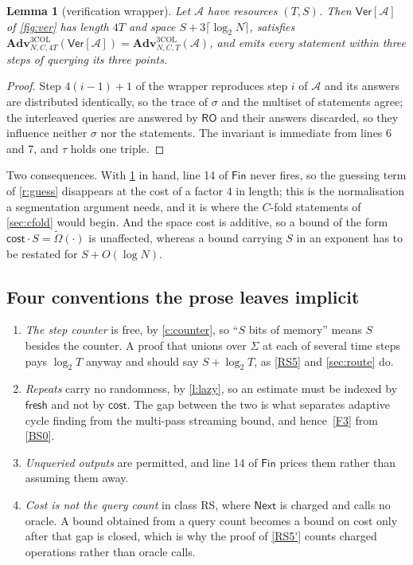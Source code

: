 \documentclass[11pt]{article}
\theoremstyle{plain}
\newtheorem{lemma}{Lemma}
\theoremstyle{definition}
\newcommand{\advers}{\mathcal{A}}
\newcommand{\Next}{\mathsf{Next}}
\newcommand{\cls}[1]{\textsf{#1}}   %
\newcommand{\Col}{\mathrm{3COL}}
\newcommand{\RO}{\mathsf{RO}}
\newcommand{\Fin}{\mathsf{Fin}}
\newcommand{\Ver}{\mathsf{Ver}}
\newcommand{\Adv}{\mathbf{Adv}}
\begin{document}
\begin{lemma}[verification wrapper]\label{l:ver}
Let $\advers$ have resources $(T,S)$.  Then $\Ver[\advers]$ of
\cref{fig:ver} has length $4T$ and space $S + 3\lceil\log_{2}N\rceil$,
satisfies $\Adv^{\Col}_{N,C,4T}(\Ver[\advers]) =
\Adv^{\Col}_{N,C,T}(\advers)$, and emits every statement within three steps
of querying its three points.
\end{lemma}

\begin{proof}
Step $4(i-1)+1$ of the wrapper reproduces step $i$ of $\advers$ and its
answers are distributed identically, so the trace of $\sigma$ and the
multiset of statements agree; the interleaved queries are answered by $\RO$
and their answers discarded, so they influence neither $\sigma$ nor the
statements.  The invariant is immediate from lines 6 and 7, and $\tau$ holds
one triple.
\end{proof}

Two consequences.  With \cref{l:ver} in hand, line 14 of $\Fin$ never fires,
so the guessing term of \cref{r:guess} disappears at the cost of a factor
$4$ in length; this is the normalisation a segmentation argument needs, and
it is where the $C$-fold statements of \cref{sec:cfold} would begin.  And
the space cost is additive, so a bound of the form
$\mathsf{cost} \cdot S = \tilde\Omega(\cdot)$ is unaffected, whereas a bound
carrying $S$ in an exponent has to be restated for $S + O(\log N)$.

\subsection{Four conventions the prose leaves implicit}\label{app:pitfalls}

\begin{enumerate}[leftmargin=*,label=(\roman*)]\itemsep3pt
\item \emph{The step counter} is free, by \cref{c:counter}, so ``$S$ bits of
  memory'' means $S$ besides the counter.  A proof that unions over
  $\Sigma$ at each of several time steps pays $\log_{2}T$ anyway and should
  say $S + \log_{2}T$, as \cref{RS5} and \cref{sec:route} do.
\item \emph{Repeats} carry no randomness, by \cref{l:lazy}, so an estimate
  must be indexed by $\mathsf{fresh}$ and not by $\mathsf{cost}$.  The gap
  between the two is what separates adaptive cycle finding from the
  multi-pass streaming bound, and hence~\ref{F3} from \cref{BS0}.
\item \emph{Unqueried outputs} are permitted, and line 14 of $\Fin$ prices
  them rather than assuming them away.
\item \emph{Cost is not the query count} in class \cls{RS}, where $\Next$ is
  charged and calls no oracle.  A bound obtained from a query count becomes
  a bound on cost only after that gap is closed, which is why the proof of
  \cref{RS5'} counts charged operations rather than oracle calls.
\end{enumerate}
\end{document}
